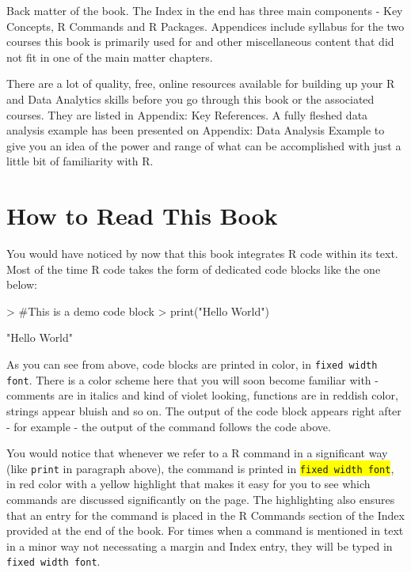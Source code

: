 Back matter of the book. The Index in the end has three main components - Key Concepts, R Commands and R Packages. Appendices include syllabus for the two courses this book is primarily used for and other miscellaneous content that did not fit in one of the main matter chapters.

There are a lot of quality, free, online resources available for building up your R and Data Analytics skills before you go through this book or the associated courses. They are listed in Appendix: Key References. A fully fleshed data analysis example has been presented on Appendix: Data Analysis Example to give you an idea of the power and range of what can be accomplished with just a little bit of familiarity with R.

\section*{How to Read This Book}

You would have noticed by now that this book integrates R code within its text. Most of the time R code takes the form of dedicated code blocks like the one below:  

\begin{Schunk}
\begin{Sinput}
> #This is a demo code block
> print("Hello World")
\end{Sinput}
\begin{Soutput}
[1] "Hello World"
\end{Soutput}
\end{Schunk}

As you can see from above, code blocks are printed in color, in \texttt{fixed width font}. There is a color scheme here that you will soon become familiar with - comments are in italics and kind of violet looking, functions are in reddish color, strings appear bluish and so on. The output of the code block appears right after - for example - the output of the  command follows the code above.

You would notice that whenever we refer to a R command in a significant way (like \texttt{print} in paragraph above), the command is printed in \colorbox{yellow}{\texttt{fixed width font}}, in red color with a yellow highlight that makes it easy for you to see which commands are discussed significantly on the page. The highlighting also ensures that an entry for the command is placed in the R Commands section of the Index provided at the end of the book. For times when a command is mentioned in text in a minor way not necessating a margin and Index entry, they will be typed in \texttt{fixed width font}.

